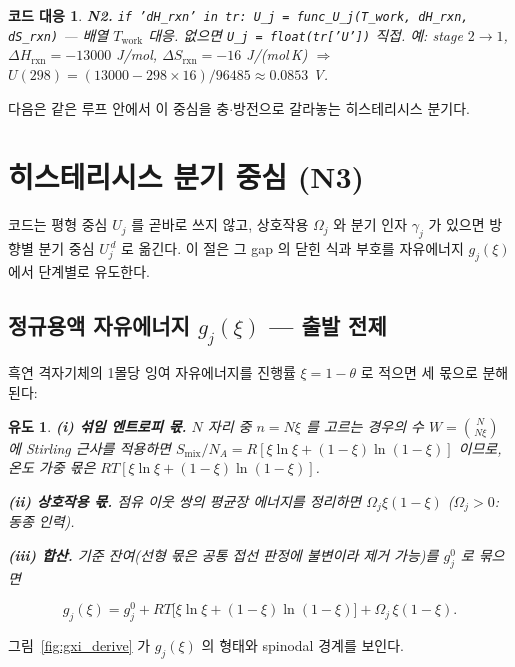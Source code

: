 \documentclass[11pt,a4paper]{article}
\newtheorem*{codebox}{코드 대응}
\newtheorem*{derivebox}{유도}
\newcommand{\rxn}{\mathrm{rxn}}
\newcommand{\work}{\mathrm{work}}
\newcommand{\code}[1]{\texttt{#1}}
\begin{document}
\begin{codebox}
\textbf{N2.} \code{if 'dH\_rxn' in tr: U\_j = func\_U\_j(T\_work, dH\_rxn, dS\_rxn)}
— 배열 $T_\work$ 대응. 없으면 \code{U\_j = float(tr['U'])} 직접. 예: stage $2\!\to\!1$,
$\Delta H_\rxn=-13000$ J/mol, $\Delta S_\rxn=-16$ J/(mol\,K) $\Rightarrow$ $U(298)=(13000-298\times16)/96485
\approx0.0853$ V.
\end{codebox}

다음은 같은 루프 안에서 이 중심을 충$\cdot$방전으로 갈라놓는 히스테리시스 분기다.

\section{히스테리시스 분기 중심 (N3)}\label{sec:hys}
코드는 평형 중심 $U_j$ 를 곧바로 쓰지 않고, 상호작용 $\Omega_j$ 와 분기 인자 $\gamma_j$ 가 있으면 방향별 분기 중심
$U_j^{\,d}$ 로 옮긴다. 이 절은 그 gap 의 닫힌 식과 부호를 자유에너지 $g_j(\xi)$ 에서 단계별로 유도한다.

\subsection{정규용액 자유에너지 $g_j(\xi)$ — 출발 전제}

흑연 격자기체의 1몰당 잉여 자유에너지를 진행률 $\xi=1-\theta$ 로 적으면 세 몫으로 분해된다:

\begin{derivebox}
\textbf{(i) 섞임 엔트로피 몫.} $N$ 자리 중 $n=N\xi$ 를 고르는 경우의 수 $W=\binom{N}{N\xi}$ 에 Stirling 근사를 적용하면
$S_\mathrm{mix}/N_A=R[\xi\ln\xi+(1-\xi)\ln(1-\xi)]$ 이므로, 온도 가중 몫은 $RT[\xi\ln\xi+(1-\xi)\ln(1-\xi)]$.

\textbf{(ii) 상호작용 몫.} 점유 이웃 쌍의 평균장 에너지를 정리하면 $\Omega_j\xi(1-\xi)$ ($\Omega_j>0$: 동종 인력).

\textbf{(iii) 합산.} 기준 잔여(선형 몫은 공통 접선 판정에 불변이라 제거 가능)를 $g_j^0$ 로 묶으면
\end{derivebox}
\begin{equation}
g_j(\xi)=g_j^0+RT\big[\xi\ln\xi+(1-\xi)\ln(1-\xi)\big]+\Omega_j\,\xi(1-\xi).
\label{eq:gxi}
\end{equation}

그림~\ref{fig:gxi_derive} 가 $g_j(\xi)$ 의 형태와 spinodal 경계를 보인다.
\end{document}
